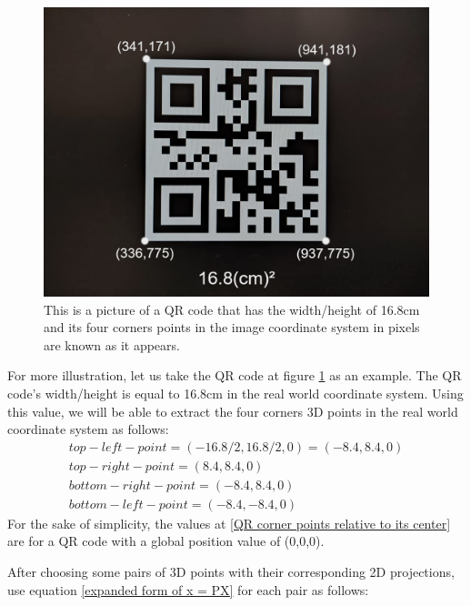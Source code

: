 \begin{figure}[h] %
	\centering
	\includegraphics[width=330pt]{assets/ch3/QR code's known points/QR code's known points.png}
	\caption{This is a picture of a QR code that has the width/height of 16.8cm and its four corners points in the image coordinate system in pixels are known as it appears.}
	\label{QR code's known points}
\end{figure}

For more illustration, let us take the QR code at figure \ref{QR code's known points} as an example. The QR code's width/height is equal to 16.8cm in the real world coordinate system. Using this value, we will be able to extract the four corners 3D points in the real world coordinate system as follows:
\begin{equation}
	\begin{matrix}
		top-left-point = (-16.8/2, 16.8/2, 0) = (-8.4, 8.4, 0)\\
		top-right-point = (8.4, 8.4, 0)\\
		bottom-right-point = (-8.4, 8.4, 0)\\
		bottom-left-point = (-8.4, -8.4, 0)
	\end{matrix}
	\label{QR corner points relative to its center}
\end{equation}
For the sake of simplicity, the values at \ref{QR corner points relative to its center} are for a QR code with a global position value of (0,0,0).

After choosing some pairs of 3D points with their corresponding 2D projections, use equation \ref{expanded form of x = PX} for each pair as follows:

